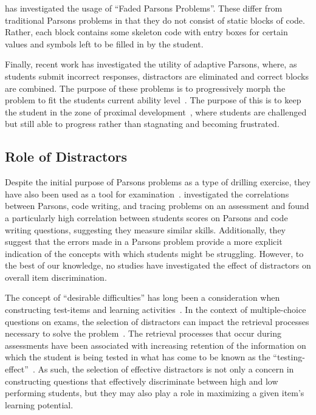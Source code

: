 \documentclass[]{acmart}
\begin{document}
\citet{weinman2021improving} has investigated the usage of ``Faded Parsons
Problems''. These differ from traditional Parsons problems in that they do not
consist of static blocks of code. Rather, each block contains some skeleton
code with entry boxes for certain values and symbols left to be filled in by
the student. 

Finally, recent work has investigated the utility of adaptive Parsons, where, 
as students submit incorrect responses, distractors are eliminated and correct
blocks are combined. The purpose of these problems is to progressively morph
the problem to fit the students current ability
level~\cite{ericson2016dynamically, ericson2019investigating}. The purpose of
this is to keep the student in the zone of proximal
development~\cite{vygotsky1978mind}, where students are challenged but still
able to progress rather than stagnating and becoming frustrated. 

\subsection{Role of Distractors}

Despite the initial purpose of Parsons problems as a type of drilling exercise,
they have also been used as a tool for examination~\cite{
lister2010naturally, lopez2008relationships}.  \citet{denny2008evaluating}
investigated the correlations between Parsons, code writing, and tracing
problems on an assessment and found a particularly high correlation between
students scores on Parsons and code writing questions, suggesting they measure
similar skills.  Additionally, they suggest that the errors made in a Parsons
problem provide a more explicit indication of the concepts with which students
might be struggling. However, to the best of our knowledge, no studies have
investigated the effect of distractors on overall item discrimination.

The concept of ``desirable difficulties'' has long been a consideration when
constructing test-items and learning activities~\cite{bjork2011making,
bjork2014multiple}.  In the context of multiple-choice questions on exams, the
selection of distractors can impact the retrieval processes necessary to solve
the problem~\cite{little2015optimizing}. The retrieval processes that occur 
during assessments have been associated with increasing retention of the
information on which the student is being tested in what has come to be known
as the ``testing-effect''~\cite{izawa1966reinforcement, rowland2014effect}.  As
such, the selection of effective distractors is not only a concern in
constructing questions that effectively discriminate between high and low
performing students, but they may also play a role in maximizing a given item's
learning potential.
\end{document}
